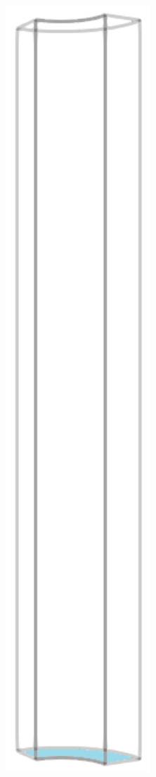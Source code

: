\begin{figure}[!htb]
  \centering
  \begin{subfigure}{0.19\textwidth}
    \centering
    \includegraphics[width=0.6\textwidth]{Chapter5/figures/spallation/geometry_bottom}

\end{subfigure}
\end{figure}
